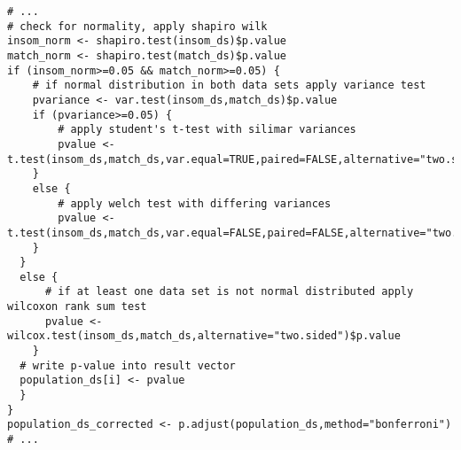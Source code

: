\begin{lstlisting}[caption={Vergleich der Populationen für den Tiefschlaf in Skript ma\_link\_population\_tests.R}, label={lst:populationtests}]
# ...
# check for normality, apply shapiro wilk
insom_norm <- shapiro.test(insom_ds)$p.value
match_norm <- shapiro.test(match_ds)$p.value
if (insom_norm>=0.05 && match_norm>=0.05) {
    # if normal distribution in both data sets apply variance test
    pvariance <- var.test(insom_ds,match_ds)$p.value
    if (pvariance>=0.05) {
        # apply student's t-test with silimar variances
        pvalue <- t.test(insom_ds,match_ds,var.equal=TRUE,paired=FALSE,alternative="two.sided")$p.value
    }
    else {
        # apply welch test with differing variances
        pvalue <- t.test(insom_ds,match_ds,var.equal=FALSE,paired=FALSE,alternative="two.sided")$p.value
    }
  }
  else {
      # if at least one data set is not normal distributed apply wilcoxon rank sum test
      pvalue <- wilcox.test(insom_ds,match_ds,alternative="two.sided")$p.value
    }
  # write p-value into result vector
  population_ds[i] <- pvalue
  }
}
population_ds_corrected <- p.adjust(population_ds,method="bonferroni")
# ...
\end{lstlisting}